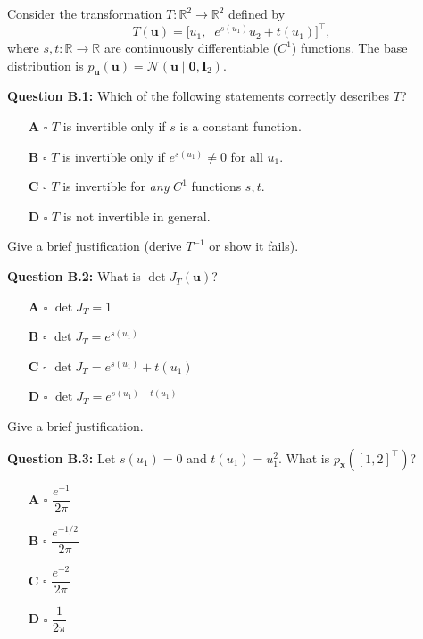 \documentclass[12pt,a4paper]{article}
\newcommand{\N}{\mathcal{N}}
\begin{document}
Consider the transformation $T:\mathbb{R}^2\to\mathbb{R}^2$ defined by
\[
  T(\mathbf{u}) = \bigl[u_1,\;\; e^{s(u_1)} u_2 + t(u_1)\bigr]^\top, \tag{2}
\]
where $s, t:\mathbb{R}\to\mathbb{R}$ are continuously differentiable ($C^1$) functions.
The base distribution is $p_{\mathbf{u}}(\mathbf{u})=\N(\mathbf{u}\mid\mathbf{0},\mathbf{I}_2)$.

\textbf{Question B.1:} Which of the following statements correctly describes $T$?

\begin{itemize}[noitemsep,label={}]
  \item[\textbf{A}] $\square$ \quad $T$ is invertible only if $s$ is a constant function.
  \item[\textbf{B}] $\square$ \quad $T$ is invertible only if $e^{s(u_1)}\neq 0$ for all $u_1$.
  \item[\textbf{C}] $\square$ \quad $T$ is invertible for \emph{any} $C^1$ functions $s, t$.
  \item[\textbf{D}] $\square$ \quad $T$ is not invertible in general.
\end{itemize}

Give a brief justification (derive $T^{-1}$ or show it fails).

\vspace{4cm}

\textbf{Question B.2:} What is $\det J_T(\mathbf{u})$?

\begin{itemize}[noitemsep,label={}]
  \item[\textbf{A}] $\square$ \quad $\det J_T = 1$
  \item[\textbf{B}] $\square$ \quad $\det J_T = e^{s(u_1)}$
  \item[\textbf{C}] $\square$ \quad $\det J_T = e^{s(u_1)} + t(u_1)$
  \item[\textbf{D}] $\square$ \quad $\det J_T = e^{s(u_1) + t(u_1)}$
\end{itemize}

Give a brief justification.

\vspace{4cm}

\textbf{Question B.3:} Let $s(u_1)=0$ and $t(u_1)=u_1^2$.  What is $p_{\mathbf{x}}([1,2]^\top)$?

\begin{itemize}[noitemsep,label={}]
  \item[\textbf{A}] $\square$ \quad $\dfrac{e^{-1}}{2\pi}$
  \item[\textbf{B}] $\square$ \quad $\dfrac{e^{-1/2}}{2\pi}$
  \item[\textbf{C}] $\square$ \quad $\dfrac{e^{-2}}{2\pi}$
  \item[\textbf{D}] $\square$ \quad $\dfrac{1}{2\pi}$
\end{itemize}
\end{document}
